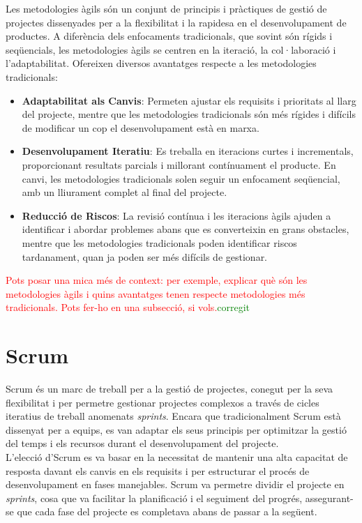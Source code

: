 \documentclass[a4paper,12pt,twoside]{ThesisStyle}
\newcommand{\pau}[1]{\textcolor{red}{#1}}
\newcommand{\sudan}[1]{\textcolor{green}{#1}}
\begin{document}
Les metodologies àgils són un conjunt de principis i pràctiques de gestió de projectes dissenyades per a la flexibilitat i la rapidesa en el desenvolupament de productes. A diferència dels enfocaments tradicionals, que sovint són rígids i seqüencials, les metodologies àgils se centren en la iteració, la col·laboració i l'adaptabilitat. Ofereixen diversos avantatges respecte a les metodologies tradicionals:
\begin{itemize}
    \item \textbf{Adaptabilitat als Canvis}: Permeten ajustar els requisits i prioritats al llarg del projecte, mentre que les metodologies tradicionals són més rígides i difícils de modificar un cop el desenvolupament està en marxa.
    \item \textbf{Desenvolupament Iteratiu}: Es treballa en iteracions curtes i incrementals, proporcionant resultats parcials i millorant contínuament el producte. En canvi, les metodologies tradicionals solen seguir un enfocament seqüencial, amb un lliurament complet al final del projecte.
    \item \textbf{Reducció de Riscos}: La revisió contínua i les iteracions àgils ajuden a identificar i abordar problemes abans que es converteixin en grans obstacles, mentre que les metodologies tradicionals poden identificar riscos tardanament, quan ja poden ser més difícils de gestionar.
\end{itemize}


\pau{Pots posar una mica més de context: per exemple, explicar què són les metodologies àgils i quins avantatges tenen respecte metodologies més tradicionals. Pots fer-ho en una subsecció, si vols.}\sudan{corregit}

\section{Scrum}
\label{subsec: Scrum}

Scrum és un marc de treball per a la gestió de projectes, conegut per la seva flexibilitat i per permetre gestionar projectes complexos a través de cicles iteratius de treball anomenats \textit{sprints}. Encara que tradicionalment Scrum està dissenyat per a equips, es van adaptar els seus principis per optimitzar la gestió del temps i els recursos durant el desenvolupament del projecte.\\


L'elecció d'Scrum es va basar en la necessitat de mantenir una alta capacitat de resposta davant els canvis en els requisits i per estructurar el procés de desenvolupament en fases manejables. Scrum va permetre dividir el projecte en \textit{sprints}, cosa que va facilitar la planificació i el seguiment del progrés, assegurant-se que cada fase del projecte es completava abans de passar a la següent.\\
\end{document}
